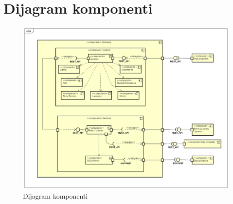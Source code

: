 			\eject
		\section{Dijagram komponenti}

\begin{figure}[htp]
	\includegraphics[scale=0.4]{dijagrami/ComponentDiagram0.png}
	\centering
	\caption{Dijagram komponenti}
\end{figure}